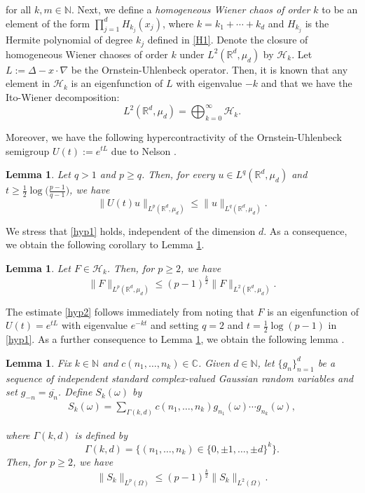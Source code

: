 \documentclass[letterpaper, 11pt,  reqno]{amsart}
\newtheorem{lemma}[theorem]{Lemma}
\newcommand{\1}{\hspace{0.5mm}\text{I}\hspace{0.5mm}}
\newcommand{\noi}{\noindent}
\newcommand{\R}{\mathbb{R}}
\newcommand{\C}{\mathbb{C}}
\newcommand{\Dl}{\Delta}
\newcommand{\G}{\Gamma}
\newcommand{\cj}{\overline}
\renewcommand{\o}{\omega}
\renewcommand{\O}{\Omega}
\newcommand{\N}{\mathbb{N}}
\numberwithin{equation}{section}
\numberwithin{theorem}{section}
\begin{document}
\noi
for all  $k,m\in\N$.
Next, we define a {\it homogeneous Wiener chaos of order
$k$} to be an element of the form $\prod_{j = 1}^d H_{k_j}(x_j)$, 
where $k= k_1 + \cdots + k_d$
and $H_{k_j}$ is the Hermite polynomial of degree $k_j$ defined in \eqref{H1}. 
Denote the closure of homogeneous Wiener chaoses of order $k$
under $L^2(\R^d, \mu_d)$ by $\mathcal{H}_k$.
Let $L := \Dl -x \cdot \nabla$ be 
 the Ornstein-Uhlenbeck operator. 
Then, 
it is known that 
any element in $\mathcal H_k$ 
is an eigenfunction of $L$ with eigenvalue $-k$
and that we have the Ito-Wiener decomposition:
\[ L^2(\R^d, \mu_d) = \bigoplus_{k = 0}^\infty \mathcal{H}_k.\]


\noi
Moreover, we have the following  hypercontractivity of the Ornstein-Uhlenbeck
semigroup $U(t) := e^{tL}$ due to Nelson \cite{Nelson2}.

\begin{lemma} \label{LEM:hyp1}
Let $q > 1$
and $p \geq q$.
Then, 
for every $u \in L^q (\R^d, \mu_d)$
and  $t \geq
\frac{1}{2}\log\big(\frac{p-1}{q-1}\big)$, we have
\begin{equation}\label{hyp1}
\|U(t) u \|_{L^p(\R^d, \mu_d)}\leq \|u\|_{L^q(\R^d, \mu_d)}.
\end{equation}
\end{lemma}
We stress that 
 \eqref{hyp1} holds, independent of the dimension $d$.
As a consequence, we obtain the following corollary to Lemma \ref{LEM:hyp1}.
\begin{lemma} \label{LEM:hyp2}
Let $F \in \mathcal{H}_k$.
Then, for $p \geq 2$, we have
\begin{equation} \label{hyp2}
\| F \|_{L^p(\R^d, \mu_d)}\leq (p-1)^\frac{k}{2}
\|F\|_{L^2(\R^d, \mu_d)}.
\end{equation}
\end{lemma}
The estimate \eqref{hyp2} follows immediately
from noting that 
 $F$ is an eigenfunction
of $U(t) = e^{tL}$ with eigenvalue $e^{-kt}$
and setting  $q = 2$ and $t =\frac{1}{2} \log (p - 1)$ in  \eqref{hyp1}.
As a further consequence to Lemma \ref{LEM:hyp2}, we obtain the following lemma
\cite[Theorem I.22]{Simon}.
%
\begin{lemma}\label{LEM:hyp3}
Fix $k \in \mathbb{N}$ and $c(n_1, \dots, n_k) \in \C$.
Given 	
 $d \in \mathbb{N}$, 
 let $\{ g_n\}_{n = 1}^d$ be 
 a sequence of  independent standard complex-valued Gaussian random variables
 and set $g_{-n} = \cj{g_n}$.
Define $S_k(\o)$ by 
\begin{align*}
 S_k(\o) = \sum_{\G(k, d)} c(n_1, \dots, n_k) g_{n_1} (\o)\cdots g_{n_k}(\o),
 \end{align*}

\noi
where $\G(k, d)$ is defined by
\[ \G(k, d) = \big\{ (n_1, \dots, n_k) \in \{0, \pm1, \dots,\pm d\}^k \big\}.\]
Then, for $p \geq 2$, we have
\begin{equation}
 \|S_k \|_{L^p(\O)} \leq (p-1)^\frac{k}{2}\|S_k\|_{L^2(\O)}.
\label{hyp4}
 \end{equation}
\end{lemma}
\end{document}
